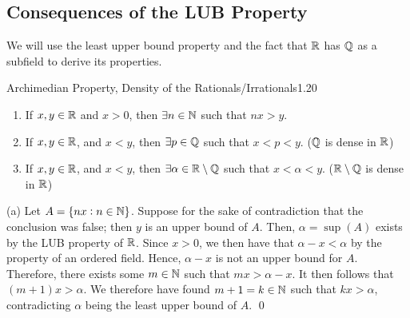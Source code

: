 \subsection{Consequences of the LUB Property}
We will use the least upper bound property and the fact that $\mathbb{R}$ has $\mathbb{Q}$ as a subfield to derive its properties.
\begin{theorem}{Archimedian Property, Density of the Rationals/Irrationals}{1.20}
    \begin{enumerate}
        \item If $x, y \in \mathbb{R}$ and $x > 0$, then $\exists n \in \mathbb{N}$ such that $nx > y$.
        \item If $x, y \in \mathbb{R}$, and $x < y$, then $\exists p \in \mathbb{Q}$ such that $x < p < y$. ($\mathbb{Q}$ is dense in $\mathbb{R}$)
        \item If $x, y \in \mathbb{R}$, and $x < y$, then $\exists \alpha \in \mathbb{R} \setminus \mathbb{Q}$ such that $x < \alpha < y$. ($\mathbb{R}\setminus\mathbb{Q}$ is dense in $\mathbb{R}$)
    \end{enumerate}
\end{theorem}

\begin{nproof}
    (a) Let $A = \set{nx: n \in \mathbb{N}}$. Suppose for the sake of contradiction that the conclusion was false; then $y$ is an upper bound of $A$. Then, $\alpha = \sup(A)$ exists by the LUB property of $\mathbb{R}$. Since $x > 0$, we then have that $\alpha - x < \alpha$ by the property of an ordered field. Hence, $\alpha - x$ is not an upper bound for $A$. Therefore, there exists some $m \in \mathbb{N}$ such that $mx > \alpha - x$. It then follows that $(m+1)x > \alpha$. We therefore have found $m+1 = k \in \mathbb{N}$ such that $kx > \alpha$, contradicting $\alpha$ being the least upper bound of $A$. \qed
\end{nproof}

